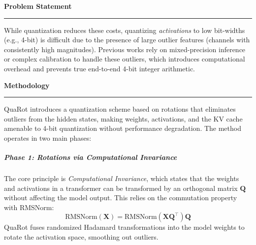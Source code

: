 \documentclass[11pt,a4paper]{article}
\newcommand{\problemp}[1]{%
  \par\medskip
  {\noindent\bfseries\normalsize\color{signcol}#1\par}%
  \vspace{0.4ex}%
  {\noindent\color{softgray}\rule{\linewidth}{0.6pt}\par}%
  \vspace{0.8ex}%
}
\theoremstyle{definition}
\begin{document}
\problemp{Problem Statement}
While quantization reduces these costs, quantizing \textit{activations} to low bit-widths (e.g., 4-bit) is difficult due to the presence of large outlier features (channels with consistently high magnitudes). Previous works rely on mixed-precision inference or complex calibration to handle these outliers, which introduces computational overhead and prevents true end-to-end 4-bit integer arithmetic.

\vspace{1cm}
\problemp{Methodology}
QuaRot introduces a quantization scheme based on rotations that eliminates outliers from the hidden states, making weights, activations, and the KV cache amenable to 4-bit quantization without performance degradation. The method operates in two main phases:

\subparagraph{Phase 1: Rotations via Computational Invariance}
The core principle is \textit{Computational Invariance}, which states that the weights and activations in a transformer can be transformed by an orthogonal matrix $\bm{Q}$ without affecting the model output. This relies on the commutation property with RMSNorm:
\begin{equation}
  \text{RMSNorm}(\bm{X}) = \text{RMSNorm}(\bm{X}\bm{Q}^\top)\bm{Q}
\end{equation}
QuaRot fuses randomized Hadamard transformations into the model weights to rotate the activation space, smoothing out outliers.
\end{document}

